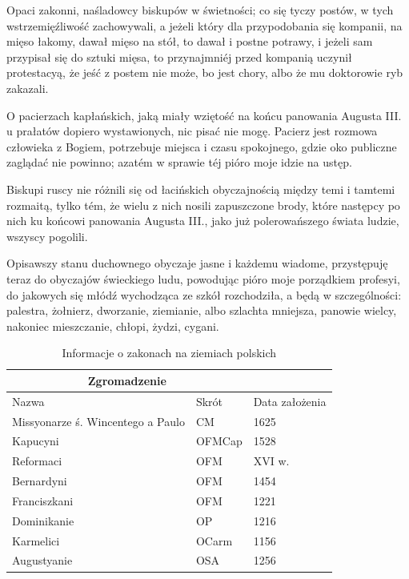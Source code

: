 \documentclass{book}
\begin{document}
Opaci zakonni, naśladowcy biskupów w świetności; co się tyczy postów, w tych wstrzemięźliwość zachowywali, a jeżeli który dla przypodobania się kompanii, na mięso łakomy, dawał mięso na stół, to dawał i postne potrawy, i jeżeli sam przypisał się do sztuki mięsa, to przynajmniéj przed kompanią uczynił protestacyą, że jeść z postem nie może, bo jest chory, albo że mu doktorowie ryb zakazali.

O pacierzach kapłańskich, jaką miały wziętość na końcu panowania Augusta III. u prałatów dopiero wystawionych, nic pisać nie mogę. Pacierz jest rozmowa człowieka z Bogiem, potrzebuje miejsca i czasu spokojnego, gdzie oko publiczne zaglądać nie powinno; azatém w sprawie téj pióro moje idzie na ustęp.

Biskupi ruscy nie różnili się od łacińskich obyczajnością między temi i tamtemi rozmaitą, tylko tém, że wielu z nich nosili zapuszczone brody, które następcy po nich ku końcowi panowania Augusta III., jako już polerowańszego świata ludzie, wszyscy pogolili.

Opisawszy stanu duchownego obyczaje jasne i każdemu wiadome, przystępuję teraz do obyczajów świeckiego ludu, powodując pióro moje porządkiem profesyi, do jakowych się młódź wychodząca ze szkół rozchodziła, a będą w szczególności: palestra, żołnierz, dworzanie, ziemianie, albo szlachta mniejsza, panowie wielcy, nakoniec mieszczanie, chłopi, żydzi, cygani.

\begin{table}[t]
    \caption[Zgromadzenia]{
        \label{tab.stolice}    
        Informacje o zakonach na ziemiach polskich
    }
    \centering
    \begin{tabular}{||l|l|l||}
        \hline\hline
        \multicolumn{2}{||c|}{Zgromadzenie} & \\ \hline
        Nazwa & Skrót & Data założenia  \\ \hline
        Missyonarze ś. Wincentego a Paulo & CM & 1625 \\
        Kapucyni & OFMCap & 1528 \\
        Reformaci & OFM & XVI w. \\
        Bernardyni & OFM & 1454 \\
        Franciszkani & OFM & 1221 \\
        Dominikanie & OP & 1216 \\
        Karmelici & OCarm & 1156 \\
        Augustyanie & OSA & 1256 \\
        \hline\hline
    \end{tabular}
\end{table}
\end{document}
